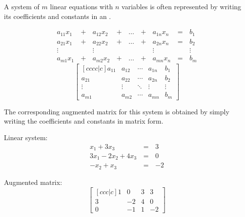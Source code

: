 \begin{definition}
  A system of \(m\) linear equations with \(n\) variables is often represented
  by writing its coefficients and constants in an .
  \begin{multicols}{2}\noindent
  \begin{alignat*}{5}
    a_{11}x_1 &\,+\,& a_{12}x_2 &\,+\,& \dots  &\,+\,& a_{1n}x_n &\,=\,& b_1 \\
    a_{21}x_1 &\,+\,& a_{22}x_2 &\,+\,& \dots  &\,+\,& a_{2n}x_n &\,=\,& b_2 \\
     \vdots&  &\vdots&   &&  &\vdots&&\vdots  \\
    a_{m1}x_1 &\,+\,& a_{m2}x_2 &\,+\,& \dots  &\,+\,& a_{mn}x_n &\,=\,& b_m
  \end{alignat*}
  \[
    \begin{bmatrix}[cccc|c]
      a_{11} & a_{12} & \cdots & a_{1n} & b_1\\
      a_{21} & a_{22} & \cdots & a_{2n} & b_2\\
      \vdots & \vdots & \ddots & \vdots & \vdots\\
      a_{m1} & a_{m2} & \cdots & a_{mn} & b_m
    \end{bmatrix}
  \]
  \end{multicols}
\end{definition}

\begin{example}
  The corresponding augmented matrix for this system is obtained by
  simply writing the coefficients and constants in matrix form.

  \begin{multicols}{2}
    Linear system:
    \begin{alignat*}{2}
       x_1 + 3x_3 &\,=\,& 3 \\
      3x_1 - 2x_2 + 4x_3 &\,=\,& 0 \\
      -x_2 +  x_3 &\,=\,& -2
    \end{alignat*}

    \columnbreak

    Augmented matrix:
    \[
      \begin{bmatrix}[ccc|c]
        1 & 0 & 3 & 3 \\
        3 & -2 & 4 & 0 \\
        0 & -1 & 1 & -2
      \end{bmatrix}
    \]
  \end{multicols}
\end{example}

